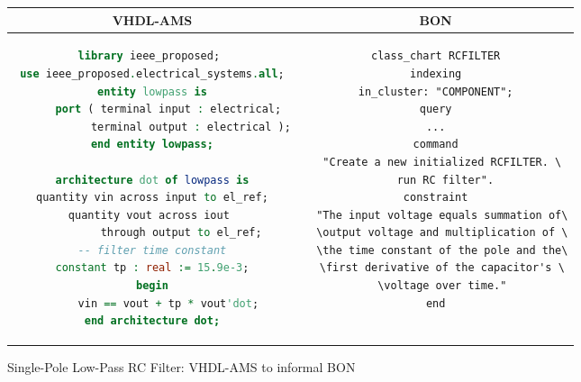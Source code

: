 \begin{figure}[h]
\begin{tabular}{ c  c }
VHDL-AMS & BON \\ \hline
\begin{minipage}[l]{6.4cm} 
\begin{lstlisting}[language=VHDL] 
library ieee_proposed; 
use ieee_proposed.electrical_systems.all;
entity lowpass is
     port ( terminal input : electrical;
            terminal output : electrical );
end entity lowpass;

architecture dot of lowpass is
quantity vin across input to el_ref;
quantity vout across iout 
         through output to el_ref;
-- filter time constant
constant tp : real := 15.9e-3;
begin
     vin == vout + tp * vout'dot;
end architecture dot;
\end{lstlisting}
\end{minipage}  
&
\begin{minipage}[l]{6.6cm}
\begin{lstlisting}[language=Bon]
class_chart RCFILTER
indexing
in_cluster: "COMPONENT";
query
...
command
  "Create a new initialized RCFILTER. \
   run RC filter".
constraint
  "The input voltage equals summation of\
  \output voltage and multiplication of \
  \the time constant of the pole and the\
  \first derivative of the capacitor's \
  \voltage over time."
end
\end{lstlisting}
\end{minipage}\\  
\end{tabular}
 \caption{Single-Pole Low-Pass RC Filter: VHDL-AMS to informal BON }
  \label{tab:rescapfirst}
\end{figure}
